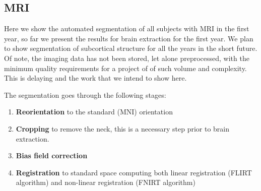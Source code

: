 \documentclass[11pt]{article}
\theoremstyle{definition}
\theoremstyle{remark}
\begin{document}
\subsection{MRI}
\label{sse:mri}
Here we show the automated segmentation of all subjects with MRI in the first year, so far we present the results for brain extraction for the first year. We plan to show segmentation of subcortical structure for all the years in the short future. Of note, the imaging data has not been stored, let alone preprocessed, with the minimum quality requirements for a project of of such volume and complexity. This is delaying and the work that we intend to show here.

The segmentation goes through the following stages:
\begin{enumerate}  
  \item \textbf{Reorientation} to the standard (MNI) orientation
  \item \textbf{Cropping} to remove the neck, this is a necessary step prior to brain extraction. 
  \item \textbf{Bias field correction} 
  \item \textbf{Registration} to standard space computing both linear registration (FLIRT algorithm) and non-linear registration (FNIRT algorithm)

\end{enumerate}
\end{document}

